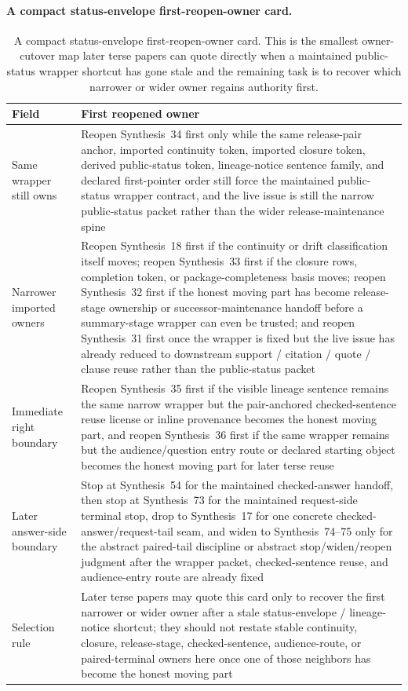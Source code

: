 \documentclass[11pt]{article}
\begin{document}
\paragraph{A compact status-envelope first-reopen-owner card.}
\begin{table}[t]
\centering
\small
\begin{tabularx}{\linewidth}{@{}lX@{}}
\toprule
Field & First reopened owner \\
\midrule
Same wrapper still owns & Reopen Synthesis~34 first only while the same release-pair anchor, imported continuity token, imported closure token, derived public-status token, lineage-notice sentence family, and declared first-pointer order still force the maintained public-status wrapper contract, and the live issue is still the narrow public-status packet rather than the wider release-maintenance spine \\
Narrower imported owners & Reopen Synthesis~18 first if the continuity or drift classification itself moves; reopen Synthesis~33 first if the closure rows, completion token, or package-completeness basis moves; reopen Synthesis~32 first if the honest moving part has become release-stage ownership or successor-maintenance handoff before a summary-stage wrapper can even be trusted; and reopen Synthesis~31 first once the wrapper is fixed but the live issue has already reduced to downstream support / citation / quote / clause reuse rather than the public-status packet \\
Immediate right boundary & Reopen Synthesis~35 first if the visible lineage sentence remains the same narrow wrapper but the pair-anchored checked-sentence reuse license or inline provenance becomes the honest moving part, and reopen Synthesis~36 first if the same wrapper remains but the audience/question entry route or declared starting object becomes the honest moving part for later terse reuse \\
Later answer-side boundary & Stop at Synthesis~54 for the maintained checked-answer handoff, then stop at Synthesis~73 for the maintained request-side terminal stop, drop to Synthesis~17 for one concrete checked-answer/request-tail seam, and widen to Synthesis~74--75 only for the abstract paired-tail discipline or abstract stop/widen/reopen judgment after the wrapper packet, checked-sentence reuse, and audience-entry route are already fixed \\
Selection rule & Later terse papers may quote this card only to recover the first narrower or wider owner after a stale status-envelope / lineage-notice shortcut; they should not restate stable continuity, closure, release-stage, checked-sentence, audience-route, or paired-terminal owners here once one of those neighbors has become the honest moving part \\
\bottomrule
\end{tabularx}
\caption{A compact status-envelope first-reopen-owner card. This is the smallest owner-cutover map later terse papers can quote directly when a maintained public-status wrapper shortcut has gone stale and the remaining task is to recover which narrower or wider owner regains authority first.}
\label{tab:status-envelope-first-reopen-owner-card}
\end{table}
\end{document}
